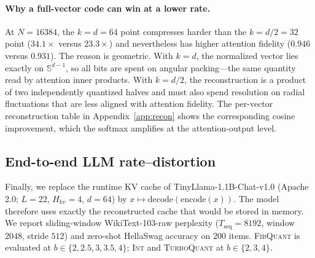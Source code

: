 \documentclass{article}
\theoremstyle{definition}
\theoremstyle{remark}
\newcommand{\bbS}{\mathbb{S}}
\begin{document}
\paragraph{Why a full-vector code can win at a lower rate.}
At $N = 16384$, the $k = d = 64$ point compresses harder than the
$k = d/2 = 32$ point ($34.1\times$ versus $23.3\times$) and
nevertheless has higher attention fidelity ($0.946$ versus $0.931$).
The reason is geometric.  With $k = d$, the normalized vector lies
exactly on $\bbS^{d - 1}$, so all bits are spent on angular
packing---the same quantity read by attention inner products.  With
$k = d/2$, the reconstruction is a product of two independently
quantized halves and must also spend resolution on radial
fluctuations that are less aligned with attention fidelity.  The
per-vector reconstruction table in Appendix~\ref{app:recon} shows
the corresponding cosine improvement, which the softmax amplifies at
the attention-output level.

\subsection{End-to-end LLM rate--distortion}
\label{sec:llm_rd}

Finally, we replace the runtime KV cache of
TinyLlama-1.1B-Chat-v1.0 (Apache 2.0; $L = 22$, $H_{kv} = 4$,
$d = 64$) by $x \mapsto \mathrm{decode}(\mathrm{encode}(x))$.  The
model therefore uses exactly the reconstructed cache that would be
stored in memory.  We report sliding-window WikiText-103-raw
perplexity ($T_{\mathrm{seq}} = 8192$, window $2048$, stride $512$)
and zero-shot HellaSwag accuracy on $200$ items.
\textsc{FibQuant} is evaluated at $b \in \{2, 2.5, 3, 3.5, 4\}$;
\textsc{Int} and \textsc{TurboQuant} at $b \in \{2, 3, 4\}$.
\end{document}
